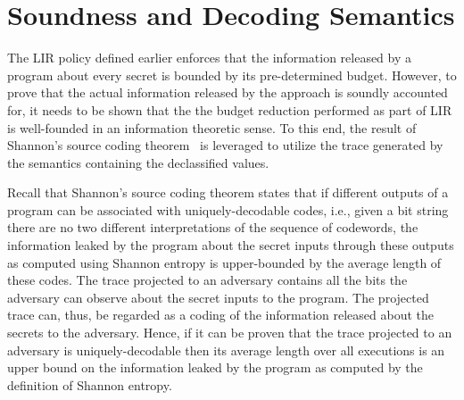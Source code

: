 \section{Soundness and Decoding Semantics}
\label{sec:lir:decoding}

The LIR policy defined earlier enforces that the information released 
by a program about every secret is bounded by its pre-determined budget. 
However, to prove that the actual information released by the approach is 
soundly accounted for, it needs to be shown that the the budget
reduction performed as part of LIR is well-founded in an information
theoretic sense. To this end, the result of Shannon's source coding
theorem~ is leveraged to utilize the trace generated
by the semantics containing the declassified values. 

Recall that Shannon's source coding theorem states that if 
different outputs of a program can be associated with uniquely-decodable
codes, i.e., given a bit string there are no two different  
interpretations of the sequence of codewords, the information 
leaked by the program about the secret inputs through these outputs 
as computed using Shannon entropy is upper-bounded by the average 
length of these codes. The trace projected to an adversary contains all  
the bits the adversary can observe about the secret inputs 
to the program. The projected trace can, thus, be regarded as a coding 
of the information released about the secrets to the adversary. 
Hence, if it can be proven that the trace projected to an adversary
is uniquely-decodable then its average length over all executions
is an upper bound on the information leaked by the program as 
computed by the definition of Shannon entropy. 

